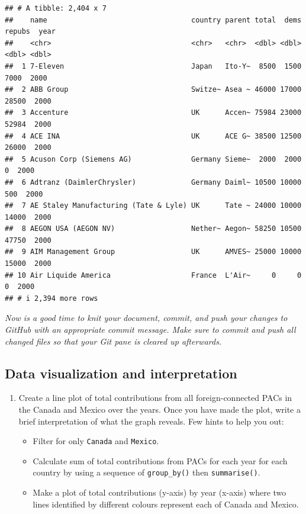 \documentclass[
]{article}
\providecommand{\tightlist}{%
  \setlength{\itemsep}{0pt}\setlength{\parskip}{0pt}}
\begin{document}
\begin{verbatim}
## # A tibble: 2,404 x 7
##    name                                  country parent total  dems repubs  year
##    <chr>                                 <chr>   <chr>  <dbl> <dbl>  <dbl> <dbl>
##  1 7-Eleven                              Japan   Ito-Y~  8500  1500   7000  2000
##  2 ABB Group                             Switze~ Asea ~ 46000 17000  28500  2000
##  3 Accenture                             UK      Accen~ 75984 23000  52984  2000
##  4 ACE INA                               UK      ACE G~ 38500 12500  26000  2000
##  5 Acuson Corp (Siemens AG)              Germany Sieme~  2000  2000      0  2000
##  6 Adtranz (DaimlerChrysler)             Germany Daiml~ 10500 10000    500  2000
##  7 AE Staley Manufacturing (Tate & Lyle) UK      Tate ~ 24000 10000  14000  2000
##  8 AEGON USA (AEGON NV)                  Nether~ Aegon~ 58250 10500  47750  2000
##  9 AIM Management Group                  UK      AMVES~ 25000 10000  15000  2000
## 10 Air Liquide America                   France  L'Air~     0     0      0  2000
## # i 2,394 more rows
\end{verbatim}

\emph{Now is a good time to knit your document, commit, and push your
changes to GitHub with an appropriate commit message. Make sure to
commit and push all changed files so that your Git pane is cleared up
afterwards.}

\subsection{Data visualization and
interpretation}\label{data-visualization-and-interpretation}

\begin{enumerate}
\def\labelenumi{\arabic{enumi}.}
\setcounter{enumi}{3}
\item
  Create a line plot of total contributions from all foreign-connected
  PACs in the Canada and Mexico over the years. Once you have made the
  plot, write a brief interpretation of what the graph reveals. Few
  hints to help you out:

  \begin{itemize}
  \tightlist
  \item
    Filter for only \texttt{Canada} and \texttt{Mexico}.
  \item
    Calculate sum of total contributions from PACs for each year for
    each country by using a sequence of \texttt{group\_by()} then
    \texttt{summarise()}.
  \item
    Make a plot of total contributions (y-axis) by year (x-axis) where
    two lines identified by different colours represent each of Canada
    and Mexico.
  \end{itemize}
\end{enumerate}
\end{document}
